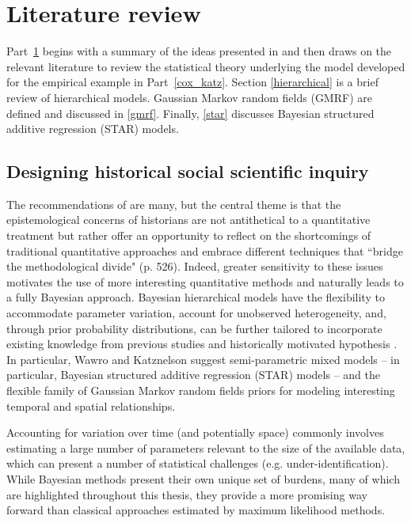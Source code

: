 
\chapter{Literature review}
\label{lit_review}

Part~\ref{lit_review} begins with a summary of the ideas presented in  and then draws on the relevant literature to review the statistical theory underlying the model developed for the empirical example in Part~\ref{cox_katz}. Section \ref{hierarchical} is a brief review of hierarchical models. Gaussian Markov random fields (GMRF) are defined and discussed in \ref{gmrf}. Finally, \ref{star} discusses Bayesian structured additive regression (STAR) models. 

\section{Designing historical social scientific inquiry}
\label{wawro}

The recommendations of  are many, but the central theme is that the epistemological concerns of historians are not antithetical to a quantitative treatment but rather offer an opportunity to reflect on the shortcomings of traditional quantitative approaches and embrace different techniques that ``bridge the methodological divide" (p. 526). Indeed, greater sensitivity to these issues motivates the use of more interesting quantitative methods and naturally leads to a fully Bayesian approach.   Bayesian hierarchical models have the flexibility to accommodate parameter variation, account for unobserved heterogeneity, and, through prior probability distributions, can be further tailored to incorporate existing knowledge from previous studies and historically motivated hypothesis  \cite{wawro_designing_2014, goodrich_designing_2012}.  In particular, Wawro and Katznelson suggest semi-parametric mixed models -- in particular,  Bayesian structured additive regression (STAR) models -- and the flexible family of Gaussian Markov random fields priors for modeling interesting temporal and spatial relationships.

Accounting for variation over time (and potentially space) commonly involves estimating a large number of parameters relevant to the size of the available data, which can present a number of statistical challenges (e.g. under-identification). While Bayesian methods present their own unique set of burdens, many of which are highlighted throughout this thesis, they provide a more promising way forward than classical approaches estimated by maximum likelihood methods. 


